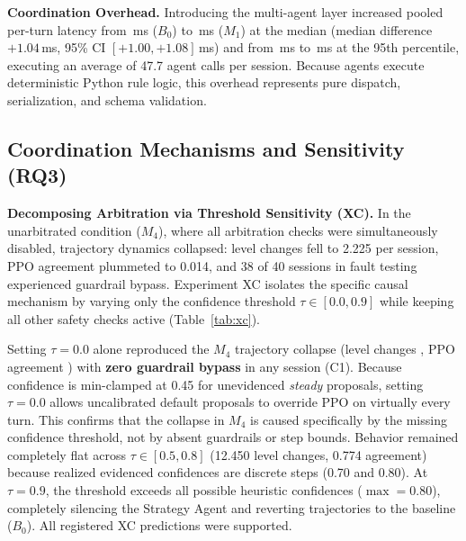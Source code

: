 \noindent\textbf{Coordination Overhead.} Introducing the multi-agent layer increased pooled per-turn latency from \xaBzeroMed{}\,ms ($B_0$) to \xaMoneMed{}\,ms ($M_1$) at the median (median difference $+1.04$\,ms, 95\% CI $[+1.00, +1.08]$\,ms) and from \xaBzeroHigh{}\,ms to \xaMoneHigh{}\,ms at the 95th percentile, executing an average of 47.7 agent calls per session. Because agents execute deterministic Python rule logic, this overhead represents pure dispatch, serialization, and schema validation.

\begin{table}[tbp]
\centering\scriptsize\setlength{\tabcolsep}{3pt}
\caption{Registered predictions and empirical outcomes for Experiment XA.}\label{tab:preds}

\end{table}

\subsection{Coordination Mechanisms and Sensitivity (RQ3)}

\begin{table}[tbp]
\centering\scriptsize\setlength{\tabcolsep}{3pt}
\caption{Experiment XC (REPLAY, 160 sessions per row, mean per session): only confidence threshold $\tau$ varies; evidence requirements and guardrails remain active. \textbf{chg./rev.}: mean level changes and reversals; \textbf{agr.}: agreement with PPO; \textbf{strat.}: decisions from Strategy Agent; \textbf{byp.}: sessions with guardrail bypass.}\label{tab:xc}

\end{table}

\noindent\textbf{Decomposing Arbitration via Threshold Sensitivity (XC).} In the unarbitrated condition ($M_4$), where all arbitration checks were simultaneously disabled, trajectory dynamics collapsed: level changes fell to 2.225 per session, PPO agreement plummeted to 0.014, and 38 of 40 sessions in fault testing experienced guardrail bypass. Experiment XC isolates the specific causal mechanism by varying only the confidence threshold $\tau \in [0.0, 0.9]$ while keeping all other safety checks active (Table~\ref{tab:xc}).

Setting $\tau = 0.0$ alone reproduced the $M_4$ trajectory collapse (level changes \xctauzerochg{}, PPO agreement \xctauzeroagr{}) with \textbf{zero guardrail bypass} in any session (C1). Because confidence is min-clamped at 0.45 for unevidenced \emph{steady} proposals, setting $\tau = 0.0$ allows uncalibrated default proposals to override PPO on virtually every turn. This confirms that the collapse in $M_4$ is caused specifically by the missing confidence threshold, not by absent guardrails or step bounds. Behavior remained completely flat across $\tau \in [0.5, 0.8]$ (12.450 level changes, 0.774 agreement) because realized evidenced confidences are discrete steps (0.70 and 0.80). At $\tau = 0.9$, the threshold exceeds all possible heuristic confidences ($\max = 0.80$), completely silencing the Strategy Agent and reverting trajectories to the baseline ($B_0$). All \xcsupported{} registered XC predictions were supported.

